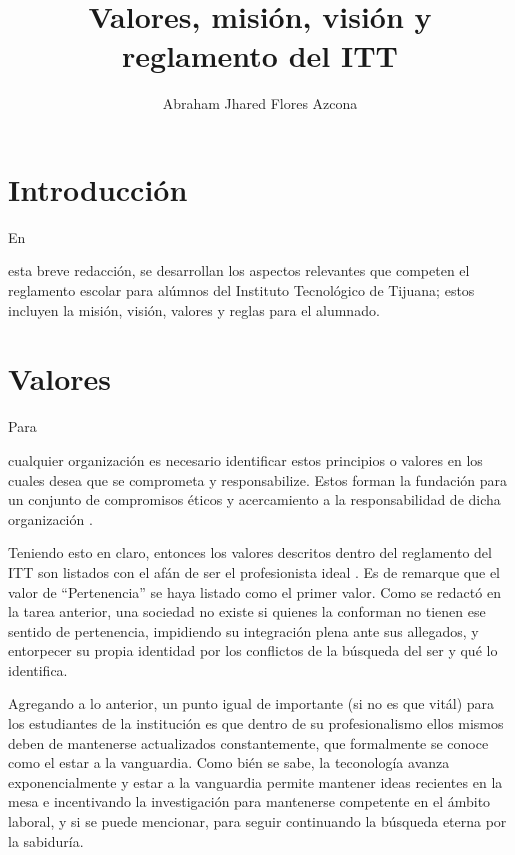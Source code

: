 \documentclass[stu, 12pt, letterpaper, donotrepeattitle, floatsintext, natbib]{apa7}
\title{\Large Valores, misión, visión y reglamento del ITT}
\author{Abraham Jhared Flores Azcona} %
\affiliation{Instituto Tecnológico de Tijuana}
\begin{document}
\maketitle


\renewcommand\contentsname{Contenido}
\tableofcontents

\newpage
\section{Introducción}
En \begin{justifying}
    esta breve redacción, se desarrollan los aspectos relevantes que competen el reglamento escolar para alúmnos 
    del Instituto Tecnológico de Tijuana; estos incluyen la misión, visión, valores y reglas para el alumnado.\par
\vspace{\baselineskip}
\end{justifying}

\section{Valores}
Para \begin{justifying}
    cualquier organización es necesario identificar estos principios o valores en los cuales desea que se comprometa y responsabilize.
    Estos forman la fundación para un conjunto de compromisos éticos y acercamiento a la responsabilidad de dicha organización \citep{institute-of-business-ethics-no-date}.\par
    \vspace{\baselineskip}
    Teniendo esto en claro, entonces los valores descritos dentro del reglamento del ITT son listados con el afán de ser el profesionista ideal \citep{subdireccion-academica-itt-2020}. Es de remarque 
    que el valor de ``Pertenencia'' se haya listado como el primer valor. Como se redactó en la tarea anterior, una sociedad no existe si quienes la conforman no tienen
    ese sentido de pertenencia, impidiendo su integración plena ante sus allegados, y entorpecer su propia identidad por los conflictos de la búsqueda del ser y qué lo identifica.\par
    \vspace{\baselineskip}
    Agregando a lo anterior, un punto igual de importante (si no es que vitál) para los estudiantes de la institución es que dentro de su profesionalismo ellos mismos deben de mantenerse actualizados constantemente,
    que formalmente se conoce como el estar a la vanguardia. Como bién se sabe, la teconología avanza exponencialmente y estar a la vanguardia permite mantener ideas recientes en la mesa e incentivando la investigación
    para mantenerse competente en el ámbito laboral, y si se puede mencionar, para seguir continuando la búsqueda eterna por la sabiduría.\par
    \vspace{\baselineskip}
\end{justifying} 
\end{document}
